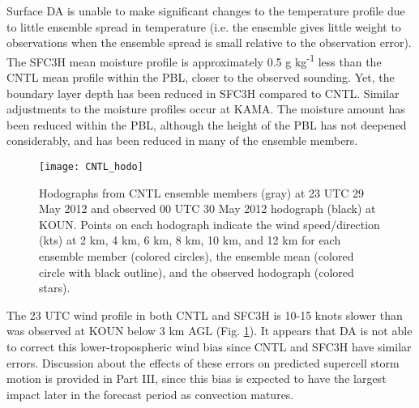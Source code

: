 Surface DA is unable to make significant changes to the temperature profile due to little ensemble spread in temperature (i.e. the ensemble gives little weight to observations when the ensemble spread is small relative to the observation error). The SFC3H mean moisture profile is approximately 0.5 g kg\textsuperscript{-1} less than the CNTL mean profile within the PBL, closer to the observed sounding. Yet, the boundary layer depth has been reduced in SFC3H compared to CNTL. Similar adjustments to the moisture profiles occur at KAMA. The moisture amount has been reduced within the PBL, although the height of the PBL has not deepened considerably, and has been reduced in many of the ensemble members.
\begin{figure}
\centering
\texttt{[image: CNTL\_hodo]}
\caption{Hodographs from CNTL ensemble members (gray) at 23 UTC 29 May 2012 and observed 00 UTC 30 May 2012 hodograph (black) at KOUN. Points on each hodograph indicate the wind speed/direction (kts) at 2 km, 4 km, 6 km, 8 km, 10 km, and 12 km for each ensemble member (colored circles), the ensemble mean (colored circle with black outline), and the observed hodograph (colored stars).}
\label{hodo}
\end{figure}

The 23 UTC wind profile in both CNTL and SFC3H is 10-15 knots slower than was observed at KOUN below 3 km AGL (Fig. \ref{hodo}). It appears that DA is not able to correct this lower-tropospheric wind bias since CNTL and SFC3H have similar errors. Discussion about the effects of these errors on predicted supercell storm motion is provided in Part III, since this bias is expected to have the largest impact later in the forecast period as convection matures.

